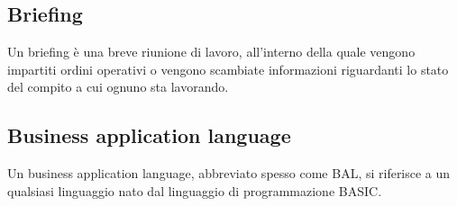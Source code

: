 \subsection*{Briefing}
Un briefing è una breve riunione di lavoro, all'interno della quale vengono impartiti ordini operativi o vengono scambiate informazioni riguardanti lo stato del compito a cui ognuno sta lavorando.

\subsection*{Business application language}
Un business application language, abbreviato spesso come BAL, si riferisce a un qualsiasi linguaggio nato dal linguaggio di programmazione BASIC.



